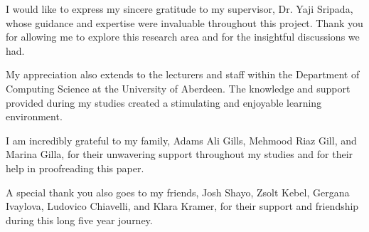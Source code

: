 \documentclass[mscip, 12pt]{abdnthesis}
\begin{document}
\begin{acknowledgements}
I would like to express my sincere gratitude to my supervisor, Dr. Yaji Sripada, whose guidance and expertise were invaluable throughout this project. Thank you for allowing me to explore this research area and for the insightful discussions we had.

My appreciation also extends to the lecturers and staff within the Department of Computing Science at the University of Aberdeen. The knowledge and support provided during my studies created a stimulating and enjoyable learning environment.

I am incredibly grateful to my family, Adams Ali Gills, Mehmood Riaz Gill, and Marina Gilla, for their unwavering support throughout my studies and for their help in proofreading this paper.

A special thank you also goes to my friends, Josh Shayo, Zsolt Kebel, Gergana Ivaylova, Ludovico Chiavelli,  and Klara Kramer, for their support and friendship during this long five year journey.
\end{acknowledgements}

\hypersetup{linkcolor=black}
\tableofcontents
\listoftables
\listoffigures
\hypersetup{linkcolor=myLinkColor}










\appendix


\end{document}
